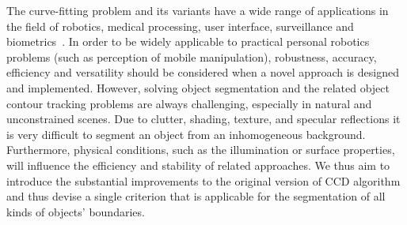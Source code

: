\documentclass[conference]{IEEEtran}
\begin{document}
The curve-fitting problem and its variants have a wide range of
applications in the field of robotics, medical processing, user
interface, surveillance and biometrics~\cite{hanek2004fitting}. In order to be
widely applicable to practical personal robotics problems (such as
perception of mobile manipulation), robustness,
accuracy, efficiency and versatility should be
considered when a novel approach is designed and implemented.
However, solving object segmentation and the
related object contour tracking problems are always challenging,
especially in natural and unconstrained scenes. Due to clutter,
shading, texture, and specular reflections it is very difficult to segment
an object from an inhomogeneous background. Furthermore, physical
conditions, such as the illumination or surface properties, will
influence the efficiency and stability of related approaches. 
We thus aim to introduce the substantial improvements to the original
version of CCD algorithm and thus devise a single criterion that is 
applicable for the segmentation of all kinds of objects' boundaries.
\end{document}
